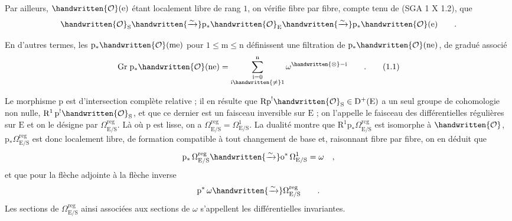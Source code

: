 Par ailleurs, $\handwritten{\mathcal{O}}(\mathrm{e})$ étant localement libre de rang $1$, on vérifie fibre par fibre, compte tenu de (SGA 1 X 1.2), que
\[
\handwritten{\mathcal{O}}_{\mathrm{S}}\handwritten{\xrightarrow{\sim}}
\mathrm{p}_{*}\handwritten{\mathcal{O}}_{\mathrm{E}}\handwritten{\xrightarrow{\sim}}
\mathrm{p}_{*}\handwritten{\mathcal{O}}(\mathrm{e})\qquad.
\]

En d'autres termes, les $\mathrm{p}_{*}\handwritten{\mathcal{O}}(\mathrm{me})$ pour $1\leq\mathrm{m}\leq\mathrm{n}$ définissent une filtration de $\mathrm{p}_{*}\handwritten{\mathcal{O}}(\mathrm{ne})$, de gradué associé
\makeatletter\tagsleft@true\makeatother
\[
\mathrm{Gr}\;\mathrm{p}_{*}\handwritten{\mathcal{O}}(\mathrm{ne})
=\sum_{\substack{\mathrm{i}=0\\\mathrm{i}\handwritten{\neq}1}}^{\mathrm{n}}\omega^{\handwritten{\otimes}-\mathrm{i}}\qquad.
\tag*{(1.1)}
\]

Le morphisme $\mathrm{p}$ est d'intersection complète relative ; il en résulte que $\mathrm{Rp}^{!}\handwritten{\mathcal{O}}_{\mathrm{S}}\in\mathrm{D}^{+}(\mathrm{E})$ a un seul groupe de cohomologie non nulle, $\mathrm{R}^{1}\,\mathrm{p}^{!}\handwritten{\mathcal{O}}_{\mathrm{S}}$, et que ce dernier est un faisceau inversible sur $\mathrm{E}$ ; on l'appelle le faisceau des différentielles régulières sur $\mathrm{E}$ et on le désigne par $\Omega^{\mathrm{reg}}_{\mathrm{E}/\mathrm{S}}$. Là où $\mathrm{p}$ est lisse, on a $\Omega^{\mathrm{reg}}_{\mathrm{E}/\mathrm{S}}=\Omega^{1}_{\mathrm{E}/\mathrm{S}}$. La dualité montre que $\mathrm{R}^{1}\mathrm{p}_{*}\Omega^{\mathrm{rcg}}_{\mathrm{E}/\mathrm{S}}$ est isomorphe à $\handwritten{\mathcal{O}}$, $\mathrm{p}_{*}\Omega^{\mathrm{reg}}_{\mathrm{E}/\mathrm{S}}$ est donc \handwritten{/} localement libre, de formation compatible à tout changement de base et, raisonnant fibre par fibre, on en déduit que
\clearpage
\[
\mathrm{p}_{*}\,\Omega^{\mathrm{reg}}_{\mathrm{E}/\mathrm{S}}\handwritten{\xrightarrow{\sim}}\mathrm{o}^{*}\,\Omega^{1}_{\mathrm{E}/\mathrm{S}}=\omega\quad,
\]
et que pour la flèche adjointe à la flèche inverse
\[
\mathrm{p}^{*}\,\omega\handwritten{\xrightarrow{\sim}}\Omega^{\mathrm{reg}}_{\mathrm{E}/\mathrm{S}}\qquad.
\]
Les sections de $\Omega^{\mathrm{reg}}_{\mathrm{E}/\mathrm{S}}$ ainsi associées aux sections de $\omega$ s'appellent les différentielles invariantes.

